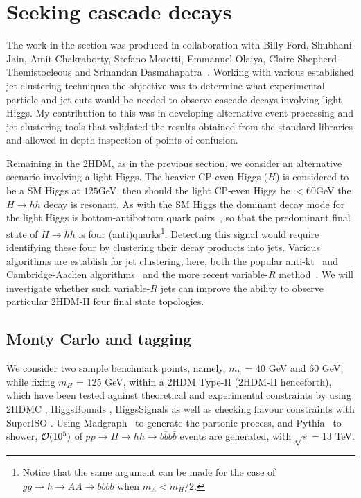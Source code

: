 \section{Seeking cascade decays}
 
The work in the section was produced in collaboration with Billy Ford, Shubhani Jain, Amit Chakraborty, Stefano Moretti, Emmanuel Olaiya, Claire Shepherd-Themistocleous and Srinandan Dasmahapatra~\cite{chakraborty2020revisiting}.
Working with various established jet clustering techniques the objective was to determine what experimental particle and jet cuts would be needed to observe cascade decays involving light Higgs.
My contribution to this was in developing alternative event processing and jet clustering tools that
validated the results obtained from the standard libraries and allowed in depth inspection of points of confusion.

Remaining in the 2HDM, as in the previous section, we consider an alternative scenario involving a light Higgs.
The heavier CP-even Higgs (\(H\)) is considered to be a SM Higgs at \(125\)GeV,
then should the light CP-even Higgs be \(< 60\)GeV the \(H\rightarrow{} hh\) decay is resonant.
As with the SM Higgs the dominant decay mode for the light Higgs is bottom-antibottom quark pairs~\cite{Moretti1994belowThreshold,Djouadi1995twoAndthree}, so that the predominant final state of \(H\rightarrow{} hh\) is four (anti)quarks\footnote{Notice that the same argument can be made for the case of $gg\to h\to AA\to b\bar b b\bar b$ when $m_A<m_H/2$.}.
Detecting this signal would require identifying these four  by clustering their decay products into jets.
Various algorithms are establish for jet clustering, here, both the popular
anti-kt~\cite{Cacciari2008akt} and Cambridge-Aachen algorithms~\cite{Wobisch1998caJet} and the
more recent variable-$R$ method~\cite{Krohn2009variableR}. 
We will investigate whether such variable-$R$ jets can improve the ability to observe particular 2HDM-II four  final state topologies. 

\subsection{Monty Carlo and tagging}

We consider two sample benchmark points, namely, $m_{h}$ = 40 GeV and 60 GeV, while  fixing $m_{H}$ = 125 GeV, within a 2HDM Type-II (2HDM-II henceforth), which have been tested against theoretical and experimental constraints by
using 2HDMC \cite{Eriksson20102HDMC}, HiggsBounds \cite{Bechtle2014higgsbounds4}, HiggsSignals \cite{Bechtle2014higgssignals} as well as checking flavour constraints with SuperISO \cite{Mahmoudi2008SuperIso}. 
Using Madgraph~\cite{alwall_madgraph2011} to generate the partonic process, and Pythia~\cite{sjostrand_pythia2015} to shower, ${\cal O}(10^5)$ of \(pp \rightarrow{} H \rightarrow{} hh \rightarrow{} b\bar{b}b\bar{b}\) events are generated, with $\sqrt{s}=13 $ TeV.

